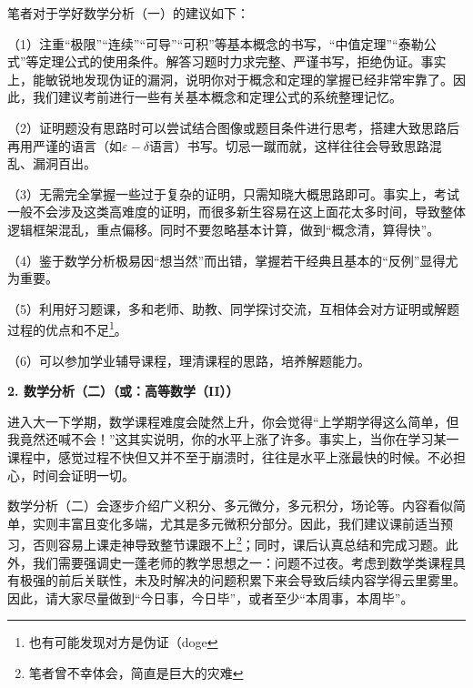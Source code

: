 \documentclass[11pt,oneside]{book}
\begin{document}
\vspace{10pt}

笔者对于学好数学分析（一）的建议如下：

\vspace{10pt}

（1）注重“极限”“连续”“可导”“可积”等基本概念的书写，“中值定理”“泰勒公式”等定理公式的使用条件。解答习题时力求完整、严谨书写，拒绝伪证。事实上，能敏锐地发现伪证的漏洞，说明你对于概念和定理的掌握已经非常牢靠了。因此，我们建议考前进行一些有关基本概念和定理公式的系统整理记忆。

\vspace{10pt}

（2）证明题没有思路时可以尝试结合图像或题目条件进行思考，搭建大致思路后再用严谨的语言（如$\varepsilon-\delta$语言）书写。切忌一蹴而就，这样往往会导致思路混乱、漏洞百出。

\vspace{10pt}

（3）无需完全掌握一些过于复杂的证明，只需知晓大概思路即可。事实上，考试一般不会涉及这类高难度的证明，而很多新生容易在这上面花太多时间，导致整体逻辑框架混乱，重点偏移。同时不要忽略基本计算，做到“概念清，算得快”。

\vspace{10pt}

（4）鉴于数学分析极易因“想当然”而出错，掌握若干经典且基本的“反例”显得尤为重要。

\vspace{10pt}

（5）利用好习题课，多和老师、助教、同学探讨交流，互相体会对方证明或解题过程的优点和不足\footnote{也有可能发现对方是伪证（doge}。

\vspace{10pt}

（6）可以参加学业辅导课程，理清课程的思路，培养解题能力。

\vspace{10pt}

\textbf{2. 数学分析（二）（或：高等数学（II））}

进入大一下学期，数学课程难度会陡然上升，你会觉得“上学期学得这么简单，但我竟然还喊不会！”这其实说明，你的水平上涨了许多。事实上，当你在学习某一课程中，感觉过程不快但又并不至于崩溃时，往往是水平上涨最快的时候。不必担心，时间会证明一切。

\vspace{10pt}

数学分析（二）会逐步介绍广义积分、多元微分，多元积分，场论等。内容看似简单，实则丰富且变化多端，尤其是多元微积分部分。因此，我们建议课前适当预习，否则容易上课走神导致整节课跟不上\footnote{笔者曾不幸体会，简直是巨大的灾难}；同时，课后认真总结和完成习题。此外，我们需要强调史一蓬老师的教学思想之一：问题不过夜。考虑到数学类课程具有极强的前后关联性，未及时解决的问题积累下来会导致后续内容学得云里雾里。因此，请大家尽量做到“今日事，今日毕”，或者至少“本周事，本周毕”。
\end{document}
